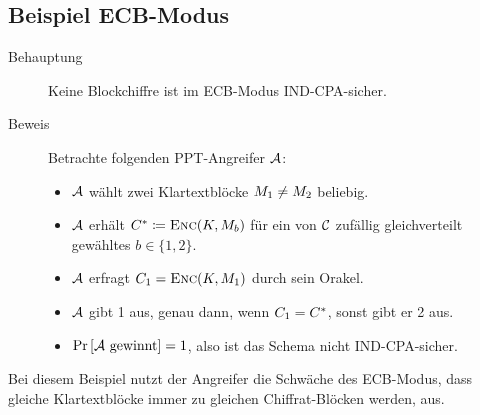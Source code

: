 \subsection{Beispiel ECB-Modus}
\begin{description}
\item[Behauptung] Keine Blockchiffre ist im ECB-Modus\indexECB
  IND-CPA-sicher.
\item[Beweis] Betrachte folgenden PPT-Angreifer $\mathcal{A}$:
  \begin{itemize}
  \item $\mathcal{A}$ wählt zwei Klartextblöcke $M_1 \neq
    M_2$ beliebig.
  \item $\mathcal{A}$ erhält $C^{*} \coloneqq \textsc{Enc}(K,
    M_{b})$ für ein von $\mathcal{C}$ zufällig gleichverteilt gewähltes $b \in
    \{1, 2\}$.
  \item $\mathcal{A}$ erfragt $C_1 = \textsc{Enc}(K, M_1)$
    durch sein Orakel.
  \item $\mathcal{A}$ gibt 1 aus, genau dann, wenn $C_1 =
    C^{*}$, sonst gibt er 2 aus.
  \item $\Pr \left[ \mathcal{A} \text{ gewinnt} \right] = 1$, also
    ist das Schema nicht IND-CPA-sicher.
  \end{itemize}
\end{description} Bei diesem Beispiel nutzt der Angreifer die Schwäche
des ECB-Modus, dass gleiche Klartextblöcke immer zu gleichen
Chiffrat-Blöcken werden, aus.

